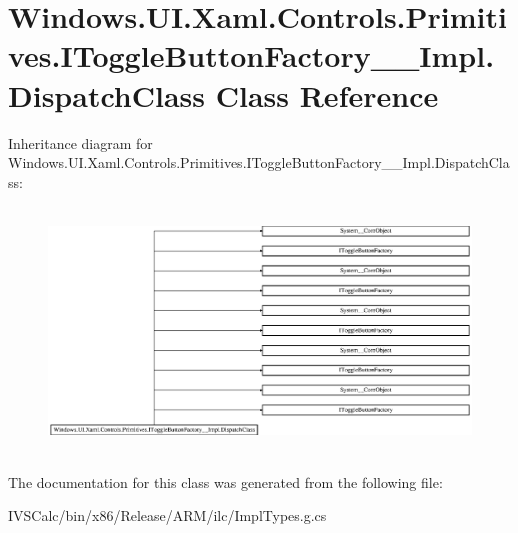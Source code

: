\hypertarget{class_windows_1_1_u_i_1_1_xaml_1_1_controls_1_1_primitives_1_1_i_toggle_button_factory_____impl_1_1_dispatch_class}{}\section{Windows.\+U\+I.\+Xaml.\+Controls.\+Primitives.\+I\+Toggle\+Button\+Factory\+\_\+\+\_\+\+Impl.\+Dispatch\+Class Class Reference}
\label{class_windows_1_1_u_i_1_1_xaml_1_1_controls_1_1_primitives_1_1_i_toggle_button_factory_____impl_1_1_dispatch_class}
Inheritance diagram for Windows.\+U\+I.\+Xaml.\+Controls.\+Primitives.\+I\+Toggle\+Button\+Factory\+\_\+\+\_\+\+Impl.\+Dispatch\+Class\+:\begin{figure}[H]
\begin{center}
\leavevmode
\includegraphics[height=6.553191cm]{class_windows_1_1_u_i_1_1_xaml_1_1_controls_1_1_primitives_1_1_i_toggle_button_factory_____impl_1_1_dispatch_class}
\end{center}
\end{figure}


The documentation for this class was generated from the following file\+:\begin{DoxyCompactItemize}
\item 
I\+V\+S\+Calc/bin/x86/\+Release/\+A\+R\+M/ilc/Impl\+Types.\+g.\+cs\end{DoxyCompactItemize}

